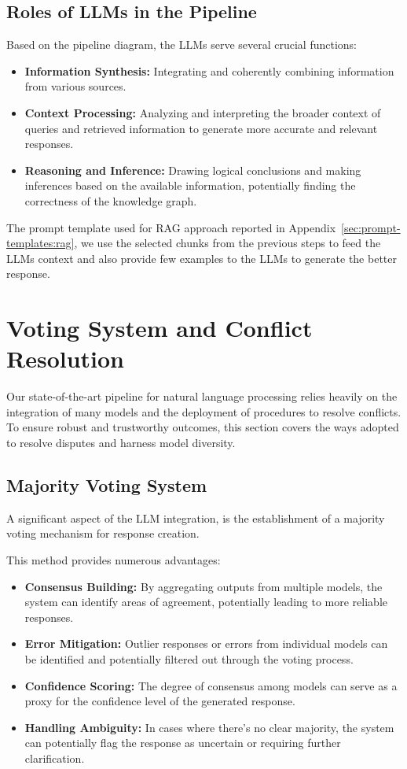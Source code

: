 \subsection{Roles of LLMs in the Pipeline}\label{subsec:roles-of-llms-in-the-pipeline}
Based on the pipeline diagram, the LLMs serve several crucial functions:
\begin{itemize}
    \item \textbf{Information Synthesis:} Integrating and coherently combining information from various sources.
    \item \textbf{Context Processing:} Analyzing and interpreting the broader context of queries and retrieved information to generate more accurate and relevant responses.
    \item \textbf{Reasoning and Inference:} Drawing logical conclusions and making inferences based on the available information, potentially finding the correctness of the knowledge graph.
\end{itemize}

The prompt template used for RAG approach reported in Appendix~\ref{sec:prompt-templates:rag}, we use the selected chunks from the previous steps to feed the LLMs context and also provide few examples to the LLMs to generate the better response.

\section{Voting System and Conflict Resolution}\label{sec:model-diversity-and-conflict-resolution}
Our state-of-the-art pipeline for natural language processing relies heavily on the integration of many models and the deployment of procedures to resolve conflicts.
To ensure robust and trustworthy outcomes, this section covers the ways adopted to resolve disputes and harness model diversity.

\subsection{Majority Voting System}\label{subsec:majority-voting-system}
A significant aspect of the LLM integration, is the establishment of a majority voting mechanism for response creation.

This method provides numerous advantages:
\begin{itemize}
    \item \textbf{Consensus Building:} By aggregating outputs from multiple models, the system can identify areas of agreement, potentially leading to more reliable responses.
    \item \textbf{Error Mitigation:} Outlier responses or errors from individual models can be identified and potentially filtered out through the voting process.
    \item \textbf{Confidence Scoring:} The degree of consensus among models can serve as a proxy for the confidence level of the generated response.
    \item \textbf{Handling Ambiguity:} In cases where there's no clear majority, the system can potentially flag the response as uncertain or requiring further clarification.
\end{itemize}

